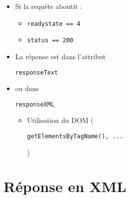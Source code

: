 \begin{itemize}
\tightlist
\item
  Si la requête aboutit :

  \begin{itemize}
  \tightlist
  \item
    \begin{otherlanguage}{english}\texttt{readystate\ ==\ 4}\end{otherlanguage}
  \item
    \begin{otherlanguage}{english}\texttt{status\ ==\ 200}\end{otherlanguage}
  \end{itemize}
\item
  La réponse est dans l'attribut
  \begin{otherlanguage}{english}\texttt{responseText}\end{otherlanguage}
\item
  ou dans
  \begin{otherlanguage}{english}\texttt{responseXML}\end{otherlanguage}

  \begin{itemize}
  \tightlist
  \item
    Utilisation du DOM
    (\begin{otherlanguage}{english}\texttt{getElementsByTagName(),\ ...}\end{otherlanguage})
  \end{itemize}
\end{itemize}

\hypertarget{ruxe9ponse-en-xml}{%
\section{Réponse en XML}\label{ruxe9ponse-en-xml}}

\begin{otherlanguage}{english}

\begin{Shaded}
\begin{Highlighting}[]
\end{Highlighting}
\end{Shaded}

\end{otherlanguage}

